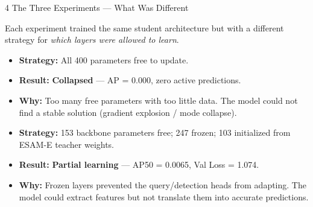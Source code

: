 \documentclass[12pt,a4paper]{article}
\newcommand{\warn}[1]{\textbf{\textcolor{warnorange}{#1}}}
\newcommand{\bad}[1]{\textbf{\textcolor{alertred}{#1}}}
\begin{document}
\begin{sectionbox}[mainblue]{4 \quad The Three Experiments — What Was Different}

Each experiment trained the same student architecture but with a different strategy
for \textit{which layers were allowed to learn}.

\vspace{6pt}
\begin{tcolorbox}[colback=lightgray,colframe=darkgray,arc=3pt,boxrule=0.8pt,
  title=\textbf{Experiment 1 — Train Everything},fonttitle=\bfseries]
\begin{itemize}[noitemsep]
  \item \textbf{Strategy:} All 400 parameters free to update.
  \item \textbf{Result:} \bad{Collapsed} — AP = 0.000, zero active predictions.
  \item \textbf{Why:} Too many free parameters with too little data. The model
        could not find a stable solution (gradient explosion / mode collapse).
\end{itemize}
\end{tcolorbox}

\vspace{6pt}
\begin{tcolorbox}[colback=lightgray,colframe=darkgray,arc=3pt,boxrule=0.8pt,
  title=\textbf{Experiment 2 — Freeze Everything Except Backbone},fonttitle=\bfseries]
\begin{itemize}[noitemsep]
  \item \textbf{Strategy:} 153 backbone parameters free; 247 frozen; 103 initialized
        from ESAM-E teacher weights.
  \item \textbf{Result:} \warn{Partial learning} — AP50 = 0.0065, Val Loss = 1.074.
  \item \textbf{Why:} Frozen layers prevented the query/detection heads from adapting.
        The model could extract features but not translate them into accurate predictions.
\end{itemize}
\end{tcolorbox}


\end{sectionbox}
\end{document}
